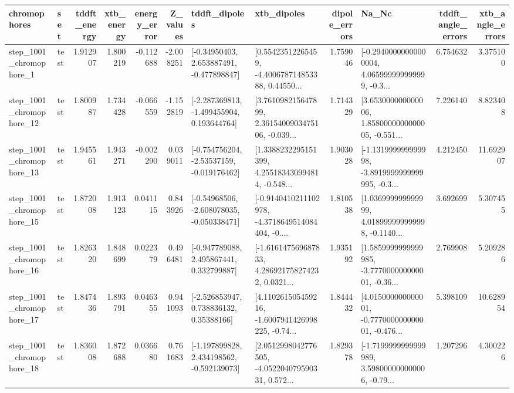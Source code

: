\begin{tabular}{llrrrrllrlrr}
\toprule
             chromophores &       set &  tddft\_energy &  xtb\_energy &  energy\_error &  Z\_values &                               tddft\_dipoles &                                        xtb\_dipoles &  dipole\_errors &                                              Na\_Nc &  tddft\_angle\_errors &  xtb\_angle\_errors \\
\midrule
  step\_1001\_chromophore\_1 &      test &      1.912907 &    1.800219 &     -0.112688 & -2.008251 &    [-0.34950403, 2.653887491, -0.477898847] &  [0.55423512265459, -4.400678714853388, 0.44550... &       1.759046 &  [-0.29400000000000004, 4.065999999999999, -0.3... &            6.754632 &          3.375100 \\
 step\_1001\_chromophore\_12 &      test &      1.800987 &    1.734428 &     -0.066559 & -1.152819 &   [-2.287369813, -1.499455904, 0.193644764] &  [3.761098215647899, 2.3615400903475106, -0.039... &       1.714329 &  [3.653000000000006, 1.8580000000000005, -0.551... &            7.226140 &          8.823408 \\
 step\_1001\_chromophore\_13 &      test &      1.945561 &    1.943271 &     -0.002290 &  0.039011 &   [-0.754756204, -2.53537159, -0.019176462] &  [1.3388232295151399, 4.255183430994814, -0.548... &       1.903028 &  [-1.131999999999998, -3.8919999999999995, -0.3... &            4.212450 &         11.692907 \\
 step\_1001\_chromophore\_15 &      test &      1.872008 &    1.913123 &      0.041115 &  0.843926 &   [-0.54968506, -2.608078035, -0.050338471] &  [-0.9140410211102978, -4.3718649514084404, -0.... &       1.810538 &  [1.036999999999999, 4.018999999999998, -0.1140... &            3.692699 &          5.307455 \\
 step\_1001\_chromophore\_16 &      test &      1.826320 &    1.848699 &      0.022379 &  0.496481 &    [-0.947789088, 2.495867441, 0.332799887] &  [-1.616147569687833, 4.286921758274232, 0.0321... &       1.935192 &  [1.5859999999999985, -3.777000000000001, -0.36... &            2.769908 &          5.209286 \\
 step\_1001\_chromophore\_17 &      test &      1.847436 &    1.893791 &      0.046355 &  0.941093 &     [-2.526853947, 0.738836132, 0.35388166] &  [4.110261505459216, -1.6007941426998225, -0.74... &       1.844432 &  [4.015000000000001, -0.777000000000001, -0.476... &            5.398109 &         10.628954 \\
 step\_1001\_chromophore\_18 &      test &      1.836008 &    1.872688 &      0.036680 &  0.761683 &   [-1.197899828, 2.434198562, -0.592139073] &  [2.0512998042776505, -4.052204079590331, 0.572... &       1.829378 &  [-1.7199999999999989, 3.598000000000006, -0.79... &            1.207296 &          4.300226 \\

\end{tabular}
